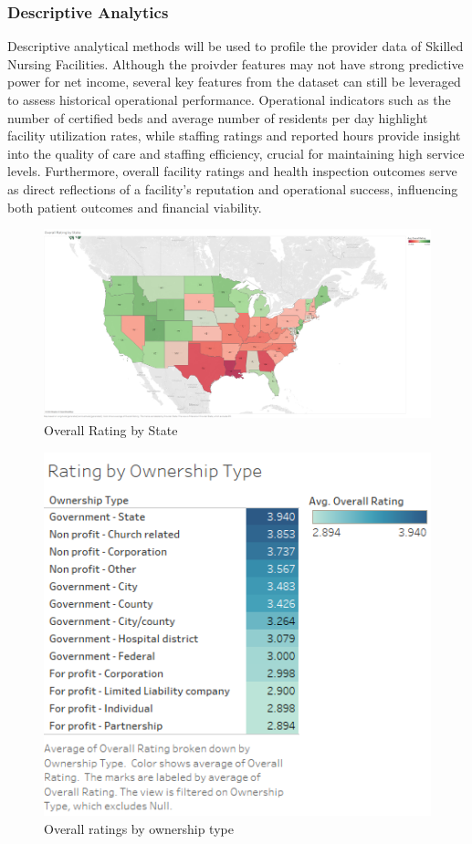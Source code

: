 \documentclass{article}
\theoremstyle{mytheoremstyle}
\theoremstyle{mytheoremstyle}
\theoremstyle{myproblemstyle}
\begin{document}
\pagebreak
\subsubsection{Descriptive Analytics}
Descriptive analytical methods will be used to profile the provider data of Skilled Nursing Facilities. Although the proivder features may not have strong predictive power for net income, several key features from the dataset can still be leveraged to assess historical operational performance. Operational indicators such as the number of certified beds and average number of residents per day highlight facility utilization rates, while staffing ratings and reported hours provide insight into the quality of care and staffing efficiency, crucial for maintaining high service levels. Furthermore, overall facility ratings and health inspection outcomes serve as direct reflections of a facility's reputation and operational success, influencing both patient outcomes and financial viability.


\begin{figure}[htbp]
\centering
\includegraphics[width=\linewidth]{Images/Overall Rating by State.png}
\caption{Overall Rating by State}
\label{Rating by state}
\end{figure}

\begin{figure}[htbp]
\centering
\includegraphics[width=0.4\linewidth]{Images/Rating by Ownership Type.png}
\caption{Overall ratings by ownership type}
\label{ratings by ownership}
\end{figure}
\end{document}
